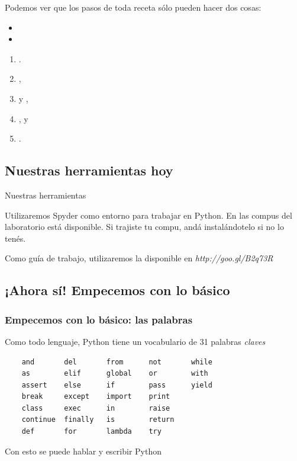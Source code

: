 \documentclass{beamer}
\begin{document}
\begin{frame}[fragile]
    Podemos ver que los pasos de toda receta sólo pueden hacer dos cosas:

    \begin{itemize}
        \item{}
        \item{}
    \end{itemize}
    \vskip 20pt
    \begin{enumerate}
        \item {}.
        \item {},
        \item {} y ,
        \item {}, y
        \item {}.
    \end{enumerate}
    
    
\end{frame}

\subsection{Nuestras herramientas hoy}
\begin{frame}[fragile]{Nuestras herramientas}

Utilizaremos Spyder como entorno para trabajar en Python. En las compus del laboratorio está disponible. Si trajiste tu compu, andá instalándotelo si no lo tenés.

\vskip11pt

Como guía de trabajo, utilizaremos la disponible en \emph{http://goo.gl/B2q73R}

\end{frame}



\subsection{¡Ahora sí! Empecemos con lo básico}
\begin{frame}[fragile]
  \frametitle{Empecemos con lo básico: las palabras}
  Como todo lenguaje, Python tiene un vocabulario de 31 palabras \emph{claves}
  \begin{verbatim}
    and       del       from      not       while
    as        elif      global    or        with
    assert    else      if        pass      yield
    break     except    import    print
    class     exec      in        raise
    continue  finally   is        return 
    def       for       lambda    try
  \end{verbatim}
  Con esto se puede hablar y escribir Python
\end{frame}
\end{document}
